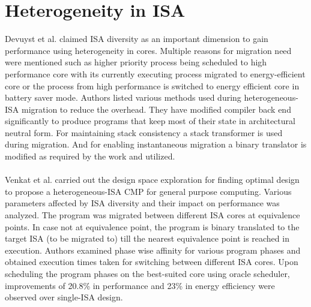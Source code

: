 \documentclass[a4paper,12pt, final]{report}
\begin{document}
\section{Heterogeneity in ISA}
Devuyst et al. \cite{DeVuystVT12} claimed ISA diversity as an important dimension to gain performance using heterogeneity in cores. Multiple reasons for migration need were mentioned such as higher priority process being scheduled to high performance core with its currently executing process migrated to energy-efficient core or the process from high performance is switched to energy efficient core in battery saver mode. Authors listed various methods used during heterogeneous-ISA migration to reduce the overhead. They have modified compiler back end significantly to produce programs that keep most of their state in architectural neutral form. For maintaining stack consistency a stack transformer is used during migration. And for enabling instantaneous migration a binary translator is modified as required by the work and utilized. \\\\
\indent Venkat et al. \cite{venkat} carried out the design space exploration for finding optimal design to propose a heterogeneous-ISA CMP for general purpose computing.
Various parameters affected by ISA diversity and their impact on performance was analyzed. The program was migrated between different ISA cores at equivalence points. In case not at equivalence point, the program is binary translated to the target ISA (to be migrated to) till the nearest equivalence point is reached in execution. Authors examined phase wise affinity for various program phases and obtained execution times taken for switching between different ISA cores. Upon scheduling the program phases on the best-suited core using oracle scheduler, improvements of 20.8\% in performance and 23\% in energy efficiency were observed over single-ISA design. \\\\
\end{document}
